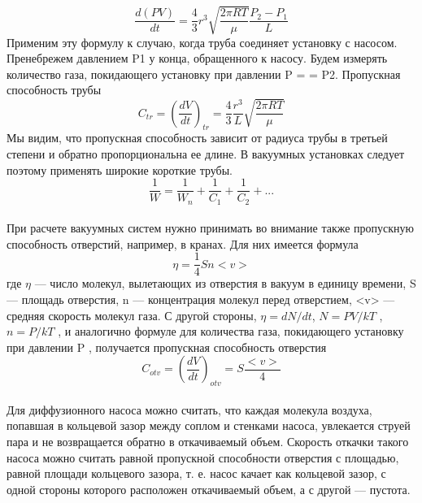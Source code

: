\documentclass[11pt]{article}
\begin{document}
$$\frac{d(PV)}{dt}=\frac{4}{3}r^3 \sqrt{\frac{2\pi RT}{\mu}} \frac{P_2-P_1}{L}$$
Применим эту формулу к случаю, когда труба соединяет установку с насосом.
Пренебрежем давлением P1 у конца, обращенного к насосу. Будем измерять количество газа, покидающего установку при давлении P =
= P2. Пропускная способность трубы
$$C_{tr}=(\frac{dV}{dt})_{tr}=\frac{4}{3}\frac{r^3}{L}\sqrt{\frac{2\pi RT}{\mu}}$$
Мы видим, что пропускная способность зависит от радиуса трубы в третьей степени и обратно пропорциональна ее длине. В вакуумных установках следует поэтому применять широкие короткие  трубы.
$$\frac{1}{W}=\frac{1}{W_n}+\frac{1}{C_1}+\frac{1}{C_2}+...$$
\newpage
\ \\
При расчете вакуумных систем нужно принимать во внимание также пропускную способность отверстий, например, в кранах. Для них имеется формула $$\eta=\frac{1}{4}Sn<v>$$
где $\eta$ — число молекул, вылетающих из отверстия в вакуум в единицу времени, S — площадь отверстия, n — концентрация молекул перед отверстием, <v> — средняя скорость молекул газа. С другой стороны, $\eta = dN/dt$, $N = PV/kT$ , $n = P/kT$ , и аналогично формуле для количества газа, покидающего установку при давлении P , получается пропускная способность отверстия
$$C_{otv}=(\frac{dV}{dt})_{otv}=S\frac{<v>}{4}$$
\ \\
Для диффузионного насоса можно считать, что каждая молекула воздуха, попавшая в кольцевой зазор между соплом и стенками насоса, увлекается струей пара и не возвращается обратно в откачиваемый объем. Скорость откачки такого насоса можно считать равной пропускной способности отверстия с площадью, равной площади кольцевого зазора, т. е. насос качает как кольцевой зазор, с одной стороны которого расположен откачиваемый объем, а с другой — пустота.
\end{document}
